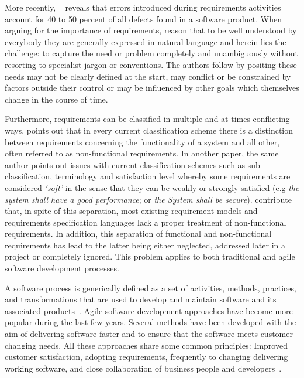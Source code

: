 \documentclass[dissertation,final]{softeng}
\begin{document}
{ More recently, ~\citet{Davis200505} reveals that errors introduced during requirements activities account for 40 to 50 percent of all defects found in a software product.  When arguing for the importance of requirements, \citet{Hull2011} reason that to be well understood by everybody they are generally expressed in natural language and herein lies the challenge: to capture the need or problem completely and unambiguously without resorting to specialist jargon or conventions. The authors follow by positing these needs may not be clearly defined at the start, may conflict or be constrained by factors outside their control or may be influenced by other goals which themselves change in the course of time.

Furthermore, requirements can be classified in multiple and at times conflicting ways. \citet{Glinz:2007ehba} points out that in every current classification scheme there is a distinction between requirements concerning the functionality of a system and all other, often referred to as non-functional requirements. In another paper, the same author points out issues with current classification schemes such as sub-classification, terminology and satisfaction level whereby some requirements are considered \emph{`soft'} in the sense that they can be weakly or strongly satisfied (e.g \emph{the system shall have a good performance}; or \emph{the System shall be secure}). \citet{Chung:2009vg} contribute that, in spite of this separation, most existing requirement models and requirements specification languages lack a proper treatment of non-functional requirements. In addition, this separation of functional and non-functional requirements has lead to the latter being either neglected, addressed later in a project or completely ignored. This problem applies to both traditional and agile software development processes. 

A software process is generically defined as a set of activities, methods, practices, and transformations that are used to develop and maintain software and its associated products~\citep{Cugola:1998htba}. Agile software development approaches have become more popular during the last few years. Several methods have been developed with the aim of delivering software faster and to ensure that the software meets customer changing needs. All these approaches share some common principles: Improved customer satisfaction, adopting requirements, frequently to changing delivering working software, and close collaboration of business people and developers~\citep{Paetsch:2003tl}.

}
\end{document}
